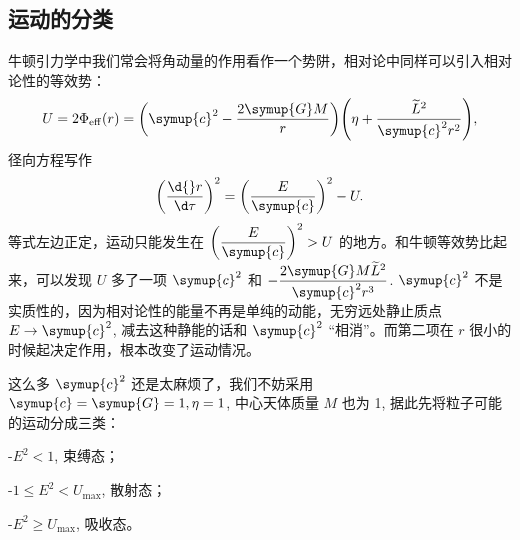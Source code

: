 \documentclass[UTF8, 12pt, a4paper, oneside, onecolumn, fontset=none]{ctexart}
\begin{document}
\subsection{运动的分类}
牛顿引力学中我们常会将角动量的作用看作一个势阱，相对论中同样可以引入相对论性的等效势：
\begin{equation}
U=2\Phi_{\mathrm{eff}}\mleft(r\mright)=\mleft(\symup{c}^{2}-\frac{2\symup{G}M}{r}\mright)\mleft(\eta+\frac{\widetilde{L}^{2}}{\symup{c}^{2}r^{2}}\mright),
\end{equation}
径向方程写作
\begin{equation}
\mleft(\frac{\d{}r}{\d\tau}\mright)^{2}=\mleft(\frac{E}{\symup{c}}\mright)^{2}-U.
\end{equation}
等式左边正定，运动只能发生在 $\mleft(\dfrac{E}{\symup{c}}\mright)^{2}>U$ 的地方。和牛顿等效势比起来，可以发现 $U$ 多了一项 $\symup{c}^{2}$ 和 $-\dfrac{2\symup{G}M\widetilde{L}^{2}}{\symup{c}^{2}r^{3}}$. $\symup{c}^{2}$ 不是实质性的，因为相对论性的能量不再是单纯的动能，无穷远处静止质点 $E\to \symup{c}^{2}$, 减去这种静能的话和 $\symup{c}^{2}$ “相消”。而第二项在 $r$ 很小的时候起决定作用，根本改变了运动情况。

这么多 $\symup{c}^{2}$ 还是太麻烦了，我们不妨采用 $\symup{c}=\symup{G}=1,\eta=1$, 中心天体质量 $M$ 也为 1, 据此先将粒子可能的运动分成三类：

\quad-\quad $E^{2}<1$, 束缚态；

\quad-\quad $1\le E^{2}<U_{\max}$, 散射态；

\quad-\quad $E^{2}\ge U_{\max}$, 吸收态。
\end{document}
